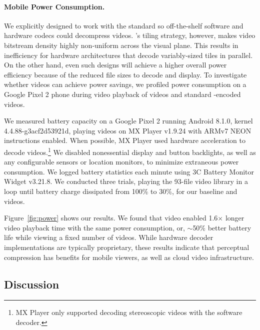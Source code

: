\paragraph{Mobile Power Consumption.}
We explicitly designed \name to work with the \hevc{} standard so off-the-shelf software and hardware codecs could decompress \name videos.
\nameCompress's tiling strategy, however, makes video bitstream density highly non-uniform across the visual plane.
This results in inefficiency for hardware architectures that decode variably-sized tiles in parallel.
On the other hand, even such designs will achieve a higher overall power efficiency because of the reduced file sizes to decode and display.
To investigate whether \name videos can achieve power savings, we profiled power consumption on a Google Pixel 2 phone during video playback of \name videos and standard \hevc-encoded videos.


We measured battery capacity on a Google Pixel 2 running Android 8.1.0, kernel 4.4.88-g3acf2d53921d, playing videos on MX Player v1.9.24 with ARMv7 NEON instructions enabled.
When possible, MX Player used hardware acceleration to decode videos.\footnote{MX Player only supported decoding stereoscopic videos with the software decoder.}
We disabled nonessential display and button backlights, as well as any configurable sensors or location monitors, to minimize extraneous power consumption.
We logged battery statistics each minute using 3C Battery Monitor Widget v3.21.8.
We conducted three trials, playing the 93-file video library in a loop until battery charge dissipated from 100\% to 30\%, for our \hevc baseline and \name videos.

Figure~\ref{fig:power} shows our results.
We found that \name video enabled 1.6$\times$ longer video playback time with the same power consumption, or, $\sim$50\% better battery life while viewing a fixed number of videos.
While hardware decoder implementations are typically proprietary, these results indicate that perceptual compression has benefits for mobile viewers, as well as cloud video infrastructure.

\subsection{Discussion}

